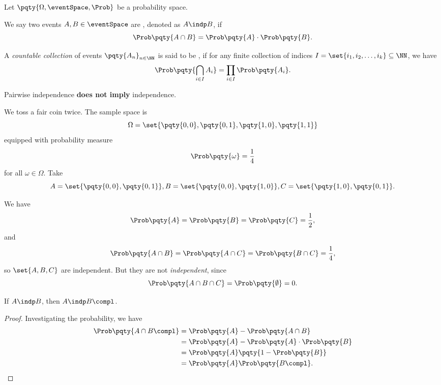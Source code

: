 Let \(\pqty{\Omega, \eventSpace, \Prob}\) be a probability space.

\begin{definition}[Independence]
    \label{def:independence}%
    We say two events \(A, B \in \eventSpace\) are , denoted as \(A \indp B\), if
    \[
        \Prob\pqty{A \cap B} = \Prob\pqty{A} \cdot \Prob\pqty{B}.
    \]

    A \emph{countable collection} of events \(\pqty{A_n}_{n \in \NN}\) is said to be , if for any finite collection of indices \(I = \set{i_1, i_2, \ldots, i_k} \subseteq \NN\), we have
    \[
        \Prob\pqty{\bigcap_{i \in I} A_i} = \prod_{i \in I} \Prob\pqty{A_i}.
    \]
\end{definition}

\begin{remark}
    Pairwise independence \textbf{does not imply} independence.
\end{remark}

\begin{example}
    \label{ex:pairwise-indep-does-not-imply-indep}
    We toss a fair coin twice. The sample space is
    \[
        \Omega = \set{\pqty{0, 0}, \pqty{0, 1}, \pqty{1, 0}, \pqty{1, 1}}
    \]
    equipped with probability measure
    \[
        \Prob\pqty{\omega} = \frac{1}{4}
    \]  
    for all \(\omega \in \Omega\). Take
    \[
        A = \set{\pqty{0, 0}, \pqty{0, 1}}, B = \set{\pqty{0, 0}, \pqty{1, 0}}, C = \set{\pqty{1, 0}, \pqty{0, 1}}.
    \]

    We have
    \[
        \Prob\pqty{A} = \Prob\pqty{B} = \Prob\pqty{C} = \frac{1}{2},
    \]
    and
    \[
        \Prob\pqty{A \cap B} = \Prob\pqty{A \cap C} = \Prob\pqty{B \cap C} = \frac{1}{4},
    \]
    so \(\set{A, B, C}\) are  independent. But they are not \emph{independent}, since
    \[
        \Prob\pqty{A \cap B \cap C} = \Prob\pqty{\emptyset} = 0.
    \]
\end{example}

\begin{proposition}
    \label{prop:indep-compl}%
    If \(A \indp B\), then \(A \indp B\compl\).
\end{proposition}

\begin{proof}
    Investigating the probability, we have
    \begin{align*}
        \Prob\pqty{A \cap B\compl} &= \Prob\pqty{A} - \Prob\pqty{A \cap B} \\
        &= \Prob\pqty{A} - \Prob\pqty{A} \cdot \Prob\pqty{B} \\
        &= \Prob\pqty{A} \pqty{1 - \Prob\pqty{B}} \\
        &= \Prob\pqty{A} \Prob\pqty{B\compl}.
    \end{align*}
\end{proof}

